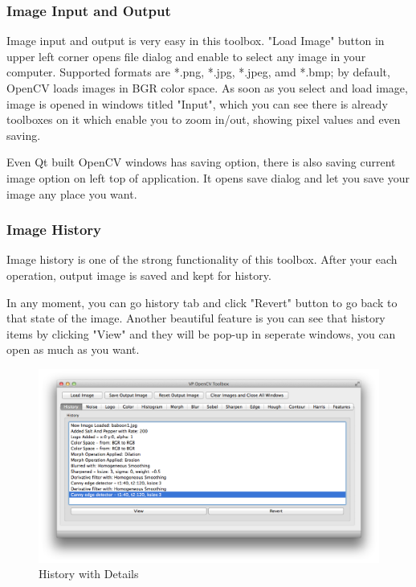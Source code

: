 \documentclass{article}
\begin{document}
\subsubsection{Image Input and Output}

	Image input and output is very easy in this toolbox. "Load Image" button in upper left corner opens file dialog and enable to select any image in your computer. Supported formats are *.png, *.jpg, *.jpeg, amd *.bmp; by default, OpenCV loads images in BGR color space. As soon as you select and load image, image is opened in windows titled "Input", which you can see there is already toolboxes on it which enable you to zoom in/out, showing pixel values and even saving. \par
	Even Qt built OpenCV windows has saving option, there is also saving current image option on left top of application. It opens save dialog and let you save your image any place you want.

\subsubsection{Image History}
	Image history is one of the strong functionality of this toolbox. After your each operation, output image is saved and kept for history. \par
	In any moment, you can go history tab and click "Revert" button to go back to that state of the image. Another beautiful feature is  you can see that history items by clicking "View" and they will be pop-up in seperate windows, you can open as much as you want.
	
\begin{figure}[H]
\begin{center}
\includegraphics[scale=0.42]{toolboxHistory.png}
\caption{History with Details}
\end{center}
\end{figure}	
\end{document}
